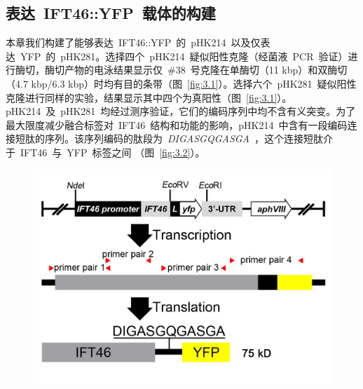 \subsection{表达\ IFT46::YFP\ 载体的构建}
本章我们构建了能够表达\ IFT46::YFP\ 的\ pHK214\ 以及仅表达\ YFP\ 的\ pHK281。选择四个\ pHK214\ 疑似阳性克隆（经菌液\ PCR\ 验证）进行酶切，酶切产物的电泳结果显示仅\ \#38\ 号克隆在单酶切（11 kbp）和双酶切（4.7 kbp/6.3 kbp）时均有目的条带（图\ \ref{fig:3.1}）。选择六个\ pHK281\ 疑似阳性克隆进行同样的实验，结果显示其中四个为真阳性（图\ \ref{fig:3.1}）。pHK214\ 及\ pHK281\ 均经过测序验证，它们的编码序列中均不含有义突变。为了最大限度减少融合标签对\ IFT46\ 结构和功能的影响，pHK214\ 中含有一段编码连接短肽的序列。该序列编码的肽段为\ \emph{DIGASGQGASGA}\ \citep{Long2012,Diener2009}，这个连接短肽介于\ IFT46\ 与\ YFP\ 标签之间
（图\ \ref{fig:3.2}）。
\begin{figure}[ht]
\centering
\graphicspath{{figures/}}
\includegraphics[width=\textwidth-50mm]{fig3-2.jpg}
{
\par}
\end{figure}
